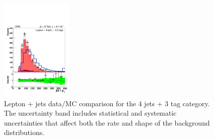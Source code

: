 \begin{figure}[hbtp]
\begin{center}
   \includegraphics[width=0.31\textwidth]{Figures/Analysis_1_Diagrams/d2MCPlots_first_jet_pt_cut4_j4_t3_Combined_HtWgt.pdf}
   \hspace{0.055\textwidth}
   \caption{Lepton + jets data/MC comparison for the 4 jets + 3 tag category.  The uncertainty band includes statistical and systematic uncertainties that affect both the rate and shape of the background distributions.}
   \label{fig:lj_input_4j_3t_part1}
 \end{center}
\end{figure}

\clearpage


